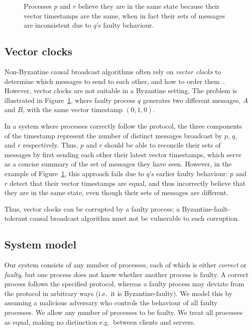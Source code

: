 \documentclass[a4paper,anonymous,USenglish]{lipics-v2019}
\begin{document}
\begin{figure}
    \centering
    
    \caption{Processes $p$ and $r$ believe they are in the same state because their vector timestamps are the same, when in fact their sets of messages are inconsistent due to $q$'s faulty behaviour.}
    \label{fig:vectorclocks}
\end{figure}

\subsection{Vector clocks}

Non-Byzantine causal broadcast algorithms often rely on \emph{vector clocks} to determine which messages to send to each other, and how to order them~\cite{Birman:1991el,Schwarz:1994}.
However, vector clocks are not suitable in a Byzantine setting.
The problem is illustrated in Figure~\ref{fig:vectorclocks}, where faulty process $q$ generates two different messages, $A$ and $B$, with the same vector timestamp $(0, 1, 0)$.

In a system where processes correctly follow the protocol, the three components of the timestamp represent the number of distinct messages broadcast by $p$, $q$, and $r$ respectively.
Thus, $p$ and $r$ should be able to reconcile their sets of messages by first sending each other their latest vector timestamps, which serve as a concise summary of the set of messages they have seen.
However, in the example of Figure~\ref{fig:vectorclocks}, this approach fails due to $q$'s earlier faulty behaviour: $p$ and $r$ detect that their vector timestamps are equal, and thus incorrectly believe that they are in the same state, even though their sets of messages are different.

Thus, vector clocks can be corrupted by a faulty process; a Byzantine-fault-tolerant causal broadcast algorithm must not be vulnerable to such corruption.

\subsection{System model}\label{sec:system-model}

Our system consists of any number of processes, each of which is either \emph{correct} or \emph{faulty}, but one process does not know whether another process is faulty.
A correct process follows the specified protocol, whereas a faulty process may deviate from the protocol in arbitrary ways (i.e.\ it is Byzantine-faulty).
We model this by assuming a malicious adversary who controls the behaviour of all faulty processes.
We allow any number of processes to be faulty.
We treat all processes as equal, making no distinction e.g.\ between clients and servers.
\end{document}
